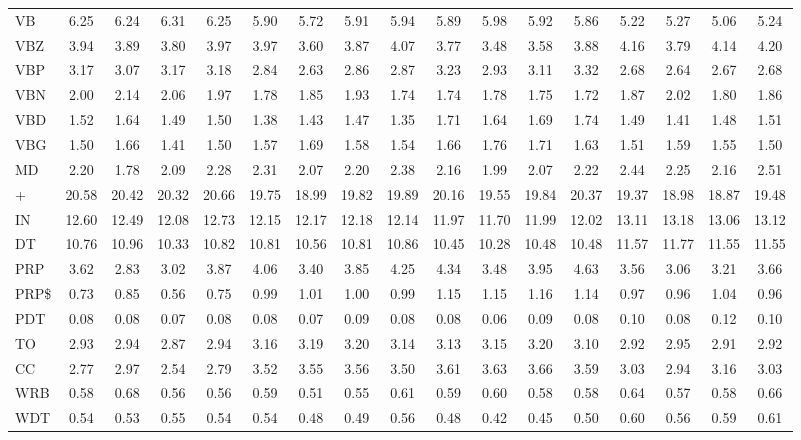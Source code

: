 \documentclass[%
 aip,
 jmp,%
 amsmath,amssymb,
 reprint,%
]{revtex4-1}
\begin{document}
\begin{table}
\begin{tabular}{|l|| c|c|c|c||  c|c|c|c||   c|c|c|c||   c|c|c|c|}
VB & 6.25 & 6.24 & 6.31 & 6.25 & 5.90 & 5.72 & 5.91 & 5.94 & 5.89 & 5.98 & 5.92 & 5.86 & 5.22 & 5.27 & 5.06 & 5.24\\
VBZ & 3.94 & 3.89 & 3.80 & 3.97 & 3.97 & 3.60 & 3.87 & 4.07 & 3.77 & 3.48 & 3.58 & 3.88 & 4.16 & 3.79 & 4.14 & 4.20\\
VBP & 3.17 & 3.07 & 3.17 & 3.18 & 2.84 & 2.63 & 2.86 & 2.87 & 3.23 & 2.93 & 3.11 & 3.32 & 2.68 & 2.64 & 2.67 & 2.68\\
VBN & 2.00 & 2.14 & 2.06 & 1.97 & 1.78 & 1.85 & 1.93 & 1.74 & 1.74 & 1.78 & 1.75 & 1.72 & 1.87 & 2.02 & 1.80 & 1.86\\
VBD & 1.52 & 1.64 & 1.49 & 1.50 & 1.38 & 1.43 & 1.47 & 1.35 & 1.71 & 1.64 & 1.69 & 1.74 & 1.49 & 1.41 & 1.48 & 1.51\\
VBG & 1.50 & 1.66 & 1.41 & 1.50 & 1.57 & 1.69 & 1.58 & 1.54 & 1.66 & 1.76 & 1.71 & 1.63 & 1.51 & 1.59 & 1.55 & 1.50\\
MD & 2.20 & 1.78 & 2.09 & 2.28 & 2.31 & 2.07 & 2.20 & 2.38 & 2.16 & 1.99 & 2.07 & 2.22 & 2.44 & 2.25 & 2.16 & 2.51\\\hline
+ & 20.58 & 20.42 & 20.32 & 20.66 & 19.75 & 18.99 & 19.82 & 19.89 & 20.16 & 19.55 & 19.84 & 20.37 & 19.37 & 18.98 & 18.87 & 19.48\\\hline\hline
IN & 12.60 & 12.49 & 12.08 & 12.73 & 12.15 & 12.17 & 12.18 & 12.14 & 11.97 & 11.70 & 11.99 & 12.02 & 13.11 & 13.18 & 13.06 & 13.12\\
DT & 10.76 & 10.96 & 10.33 & 10.82 & 10.81 & 10.56 & 10.81 & 10.86 & 10.45 & 10.28 & 10.48 & 10.48 & 11.57 & 11.77 & 11.55 & 11.55\\
PRP & 3.62 & 2.83 & 3.02 & 3.87 & 4.06 & 3.40 & 3.85 & 4.25 & 4.34 & 3.48 & 3.95 & 4.63 & 3.56 & 3.06 & 3.21 & 3.66\\
PRP\$ & 0.73 & 0.85 & 0.56 & 0.75 & 0.99 & 1.01 & 1.00 & 0.99 & 1.15 & 1.15 & 1.16 & 1.14 & 0.97 & 0.96 & 1.04 & 0.96\\
PDT & 0.08 & 0.08 & 0.07 & 0.08 & 0.08 & 0.07 & 0.09 & 0.08 & 0.08 & 0.06 & 0.09 & 0.08 & 0.10 & 0.08 & 0.12 & 0.10\\
TO & 2.93 & 2.94 & 2.87 & 2.94 & 3.16 & 3.19 & 3.20 & 3.14 & 3.13 & 3.15 & 3.20 & 3.10 & 2.92 & 2.95 & 2.91 & 2.92\\
CC & 2.77 & 2.97 & 2.54 & 2.79 & 3.52 & 3.55 & 3.56 & 3.50 & 3.61 & 3.63 & 3.66 & 3.59 & 3.03 & 2.94 & 3.16 & 3.03\\
WRB & 0.58 & 0.68 & 0.56 & 0.56 & 0.59 & 0.51 & 0.55 & 0.61 & 0.59 & 0.60 & 0.58 & 0.58 & 0.64 & 0.57 & 0.58 & 0.66\\
WDT & 0.54 & 0.53 & 0.55 & 0.54 & 0.54 & 0.48 & 0.49 & 0.56 & 0.48 & 0.42 & 0.45 & 0.50 & 0.60 & 0.56 & 0.59 & 0.61\\

\end{tabular}
\end{table}
\end{document}

